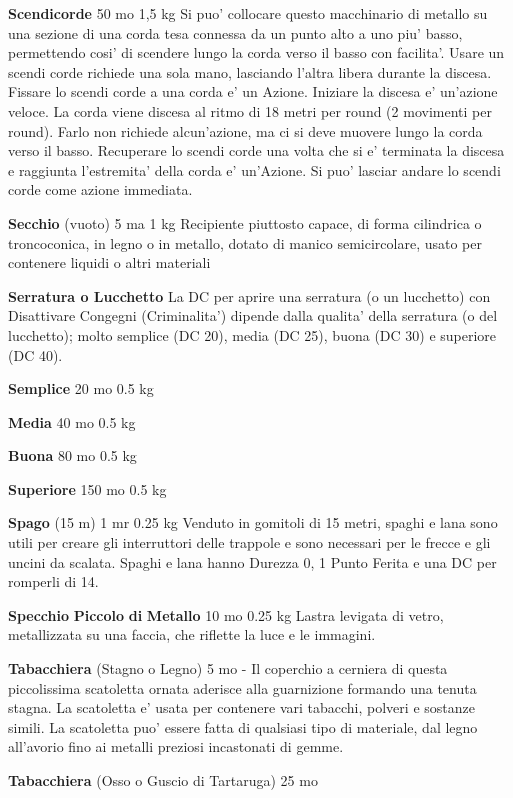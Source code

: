 \documentclass[a4paper,11pt,twoside,openany]{dndbook}
\begin{document}
{\textbf{Scendicorde} 50 mo 1,5 kg Si puo' collocare questo macchinario di metallo su una sezione di una corda tesa connessa da un punto alto a uno piu' basso, permettendo cosi' di scendere lungo la corda verso il basso con facilita'. Usare un scendi corde richiede una sola mano, lasciando l'altra libera durante la discesa. Fissare lo scendi corde a una corda e' un Azione. Iniziare la discesa e' un'azione veloce. La corda viene discesa al ritmo di 18 metri per round (2 movimenti per round). Farlo non richiede alcun'azione, ma ci si deve muovere lungo la corda verso il basso. Recuperare lo scendi corde una volta che si e' terminata la discesa e raggiunta l'estremita' della corda e' un'Azione.
Si puo' lasciar andare lo scendi corde come azione immediata.

\textbf{Secchio} (vuoto) 5 ma 1 kg Recipiente piuttosto capace, di forma cilindrica o troncoconica, in legno o in metallo, dotato di manico semicircolare, usato per contenere liquidi o altri materiali

\textbf{Serratura o Lucchetto} La DC per aprire una serratura (o un lucchetto) con Disattivare Congegni (Criminalita') dipende dalla qualita' della serratura (o del lucchetto); molto semplice (DC 20), media (DC 25), buona (DC 30) e superiore (DC 40).

\textbf{Semplice} 20 mo 0.5 kg

\textbf{Media} 40 mo 0.5 kg

\textbf{Buona} 80 mo 0.5 kg

\textbf{Superiore} 150 mo 0.5 kg

\textbf{Spago} (15 m) 1 mr 0.25 kg Venduto in gomitoli di 15 metri, spaghi e lana sono utili per creare gli interruttori delle trappole e sono necessari per le frecce e gli uncini da scalata. Spaghi e lana hanno Durezza 0, 1 Punto Ferita e una DC per romperli di 14.

\textbf{Specchio} \textbf{Piccolo} \textbf{di} \textbf{Metallo} 10 mo 0.25 kg Lastra levigata di vetro, metallizzata su una faccia, che riflette la luce e le immagini.

\textbf{Tabacchiera} (Stagno o Legno) 5 mo - Il coperchio a cerniera di questa piccolissima scatoletta ornata aderisce alla guarnizione formando una tenuta stagna. La scatoletta e' usata per contenere vari tabacchi, polveri e sostanze simili. La scatoletta puo' essere fatta di qualsiasi tipo di materiale, dal legno all'avorio fino ai metalli preziosi incastonati di gemme.

\textbf{Tabacchiera} (Osso o Guscio di Tartaruga) 25 mo

}
\end{document}
